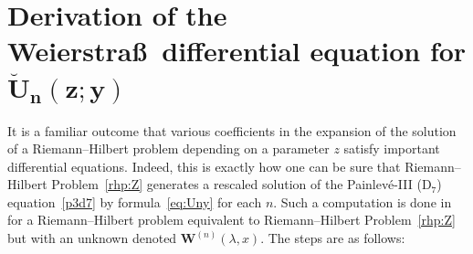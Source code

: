 \documentclass[pdftex]{sigma}
\numberwithin{equation}{section}
\begin{document}
\section[Derivation of the Weierstrass differential equation for breve{U}\_\{n\}(z;y)]{Derivation of the Weierstra\ss\ differential equation for $\boldsymbol{\breve{U}_n(z;y)}$}
It is a familiar outcome that various coefficients in the expansion of the solution of a Riemann--Hilbert problem depending on a parameter $z$ satisfy important differential equations. Indeed, this is exactly how one can be sure that Riemann--Hilbert Problem~\ref{rhp:Z} generates a rescaled solution of the Painlev\'e-III (D$_7$) equation~\eqref{p3d7} by formula~\eqref{eq:Uny} for each $n$. Such a computation is done in~\cite[Section 3.2]{BuckinghamM22} for a Riemann--Hilbert problem equivalent to Riemann--Hilbert Problem~\ref{rhp:Z} but with an unknown denoted $\mathbf{W}^{(n)}(\lambda,x)$. The steps are as follows:
\end{document}

